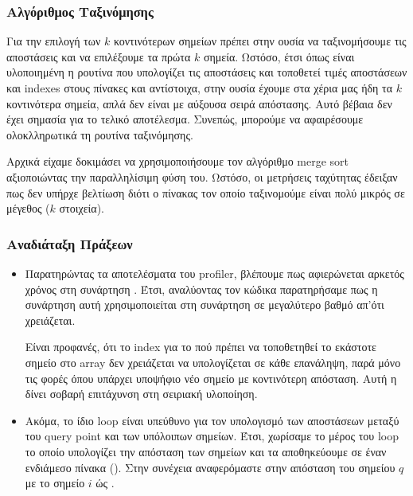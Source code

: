 \documentclass[11pt]{scrartcl} %
\begin{document}
\subsubsection{Αλγόριθμος Ταξινόμησης}

Για την επιλογή των $k$ κοντινότερων σημείων πρέπει στην ουσία να
ταξινομήσουμε τις αποστάσεις και να επιλέξουμε τα πρώτα $k$ σημεία.
Ωστόσο, έτσι όπως είναι υλοποιημένη η ρουτίνα που υπολογίζει τις αποστάσεις και
τοποθετεί τιμές αποστάσεων και indexes στους πίνακες  και  αντίστοιχα, 
στην ουσία έχουμε στα χέρια μας ήδη τα $k$ κοντινότερα σημεία, απλά δεν είναι με αύξουσα σειρά απόστασης.
Αυτό βέβαια δεν έχει σημασία για το τελικό αποτέλεσμα.
Συνεπώς, μπορούμε να αφαιρέσουμε ολοκλληρωτικά τη ρουτίνα ταξινόμησης.

Αρχικά είχαμε δοκιμάσει να χρησιμοποιήσουμε τον αλγόριθμο merge sort \cite{mergesort} 
αξιοποιώντας την παραλληλίσιμη φύση του.
Ωστόσο, οι μετρήσεις ταχύτητας έδειξαν πως δεν υπήρχε βελτίωση διότι ο πίνακας 
τον οποίο ταξινομούμε είναι πολύ μικρός σε μέγεθος ($k$ στοιχεία).

\subsubsection{Αναδιάταξη Πράξεων}

\begin{itemize}

    \item Παρατηρώντας τα αποτελέσματα του profiler, βλέπουμε πως αφιερώνεται αρκετός χρόνος στη συνάρτηση .
Έτσι, αναλύοντας τον κώδικα παρατηρήσαμε πως η συνάρτηση αυτή χρησιμοποιείται στη συνάρτηση  σε μεγαλύτερο 
βαθμό απ'ότι χρειάζεται.



Είναι προφανές, ότι το index για το πού πρέπει να τοποθετηθεί το εκάστοτε σημείο στο array δεν χρειάζεται να υπολογίζεται σε 
κάθε επανάληψη, παρά μόνο τις φορές όπου υπάρχει υποψήφιο νέο σημείο με κοντινότερη απόσταση.
Αυτή η  δίνει σοβαρή επιτάχυνση στη σειριακή υλοποίηση.

    \item Ακόμα, το ίδιο loop είναι υπεύθυνο για τον υπολογισμό των αποστάσεων μεταξύ 
        του query point και των υπόλοιπων σημείων.
        Έτσι, χωρίσαμε το μέρος του loop το οποίο υπολογίζει την απόσταση των σημείων 
        και τα αποθηκεύουμε σε έναν ενδιάμεσο πίνακα (). 
        Στην συνέχεια αναφερόμαστε στην απόσταση του σημείου $q$ με το σημείο $i$
        ώς .



\end{itemize}
\end{document}
